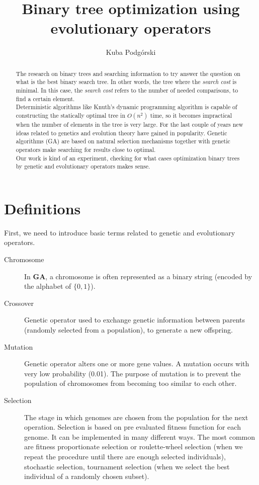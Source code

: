 \documentclass[12pt]{article}
\author{Kuba Podgórski}
\title{{\bf Binary tree optimization using evolutionary operators}}
\date{}
\begin{document}
\maketitle

\begin{abstract}
The research on binary trees and searching information to try answer the question on what is the best binary search tree. In other words, the tree where the \textit{search cost} is minimal.
In this case, the \textit{search cost} refers to the number of needed comparisons, to find a certain element.\\
Deterministic algorithms like Knuth's dynamic programming algorithm is capable of constructing the statically optimal tree in $O(n^2)$ time, so it becomes impractical when the number of elements in the tree is very large. For the last couple of years new ideas related to genetics and evolution theory have gained in popularity. Genetic algorithms (GA) are based on natural selection mechanisms together with genetic operators make searching for results close to optimal.\\
Our work is kind of an experiment, checking for what cases optimization binary trees by genetic and evolutionary operators makes sense.
\end{abstract}

\section{Definitions}
First, we need to introduce basic terms related to genetic and evolutionary operators.
\begin{description}
\item[Chromosome] In \textbf{GA}, a chromosome is often represented as a binary string (encoded by the alphabet of $\{0, 1\}$).
\item[Crossover] Genetic operator used to exchange genetic information between parents (randomly selected from a population), to generate a new offspring.
\item[Mutation] Genetic operator alters one or more gene values. A mutation occurs with very low probability (0.01). The purpose of mutation is to prevent the population of chromosomes from becoming too similar to each other.
\item[Selection] The stage in which genomes are chosen from the population for the next operation. Selection is based on pre evaluated fitness function for each genome. It can be implemented in many different ways. The most common are fitness proportionate selection or roulette-wheel selection (when we repeat the procedure until there are enough selected individuals), stochastic selection, tournament selection (when we select the best individual of a randomly chosen subset).
\end{description}
\end{document}
